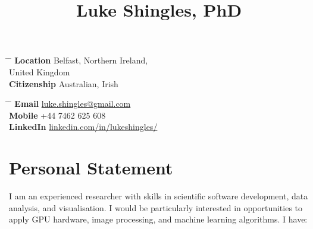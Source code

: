 \documentclass[11pt]{article} %
\begin{document}

\title{Luke Shingles, PhD} %


\parbox{0.5\textwidth}{ %
\begin{tabbing} %
\hspace{2.3cm} \= \hspace{4cm} \= \kill %
{\bf Location} \> Belfast, Northern Ireland,\\ %
\> United Kingdom \\ %
{\bf Citizenship} \> Australian, Irish %
\end{tabbing}}
\hfill %
\parbox{0.5\textwidth}{ %
\begin{tabbing} %
\hspace{2.3cm} \= \hspace{4cm} \= \kill %
{\bf Email} \> \href{mailto:luke.shingles@gmail.com}{luke.shingles@gmail.com} \\ %
{\bf Mobile} \> +44 7462 625 608‬ \\ %
{\bf LinkedIn} \> \href{https://www.linkedin.com/in/lukeshingles/}{linkedin.com/in/lukeshingles/}
\end{tabbing}}

\section{Personal Statement}
I am an experienced researcher with skills in scientific software development, data analysis, and visualisation. I would be particularly interested in opportunities to apply GPU hardware, image processing, and machine learning algorithms. I have:
\end{document}
